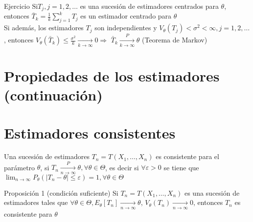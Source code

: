 




Ejercicio $\mathrm{Si} T_{j}, j=1,2, \ldots$ es una sucesión de estimadores centrados para $\theta$, entonces $\bar{T}_{k}=\frac{1}{k} \sum_{j=1}^{k} T_{j}$ es un estimador centrado para $\theta$\\
Si además, los estimadores $T_{j}$ son independientes y $V_{\theta}\left(T_{j}\right)<\sigma^{2}<\infty, j=1,2, \ldots$, entonces $V_{\theta}\left(\bar{T}_{k}\right) \leq \frac{\sigma^{2}}{k} \underset{k \rightarrow \infty}{\longrightarrow} 0 \Rightarrow$ $\bar{T}_{k} \xrightarrow[k \rightarrow \infty]{P} \theta$ (Teorema de Markov)

\section*{Propiedades de los estimadores (continuación)}
\section*{Estimadores consistentes}
Una sucesión de estimadores $T_{n}=T\left(X_{1}, \ldots, X_{n}\right)$ es consistente para el parámetro $\theta$, si $T_{n} \xrightarrow[n \rightarrow \infty]{P} \theta, \forall \theta \in \Theta$, es decir si $\forall \varepsilon>0$ se tiene que $\lim _{n \rightarrow \infty} P_{\theta}\left(\left|T_{n}-\theta\right| \leq \varepsilon\right)=1, \forall \theta \in \Theta$

Proposición 1 (condición suficiente) Si $T_{n}=T\left(X_{1}, \ldots, X_{n}\right)$ es una sucesión de estimadores tales que $\forall \theta \in \Theta, E_{\theta}\left[T_{n}\right] \underset{n \rightarrow \infty}{\longrightarrow} \theta$, $V_{\theta}\left(T_{n}\right) \underset{n \rightarrow \infty}{\longrightarrow} 0$, entonces $T_{n}$ es consistente para $\theta$

